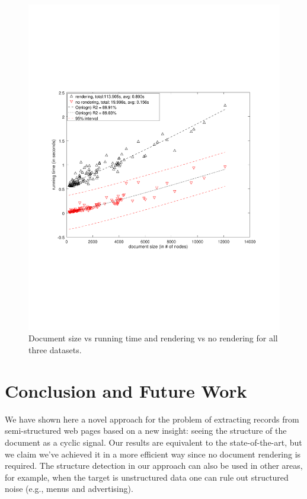\begin{figure}[h]
  \centering
     \includegraphics[trim={2.5cm 7.5cm 1cm 6.5cm}, width=\linewidth
     ]{img/runtime.pdf}
  \caption{\small{Document size vs running time and rendering vs no rendering for all three datasets.}}
  \label{fig:runtime}
\end{figure}

\vspace{-0.3cm}

\section{Conclusion and Future Work}\label{sec:con}

We have shown here a novel approach for the problem of extracting records from
semi-structured web pages based on a new insight: seeing the structure of the
document as a cyclic signal. Our results are equivalent to the state-of-the-art,
but we claim we've achieved it in a more efficient way since no document
rendering is required. The structure detection in our approach can also be used
in other areas, for example, when the target is unstructured data one can rule
out structured noise (e.g., menus and advertising).

